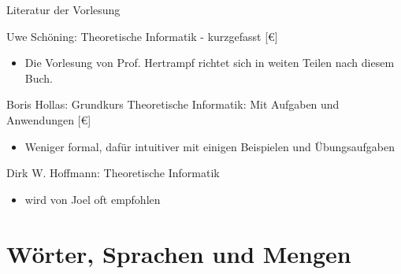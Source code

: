 \begin{frame}{Literatur der Vorlesung}
    \small{Uwe Schöning: Theoretische Informatik - kurzgefasst [€]\\
    \begin{itemize}
        \item Die Vorlesung von Prof. Hertrampf richtet sich in weiten Teilen nach diesem Buch.
    \end{itemize}
    Boris Hollas: Grundkurs Theoretische Informatik: Mit Aufgaben und Anwendungen [€]\\
    \begin{itemize}
        \item Weniger formal, dafür intuitiver mit einigen Beispielen und Übungsaufgaben
    \end{itemize}
    Dirk W. Hoffmann: Theoretische Informatik
    \begin{itemize}
        \item wird von Joel oft empfohlen
    \end{itemize}}
    
\end{frame}

\section{Wörter, Sprachen und Mengen}


